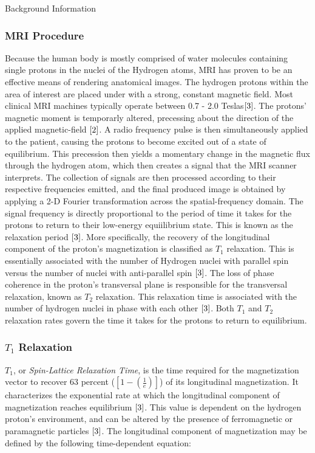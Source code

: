 \documentclass[a4paper,12pt]{article}
\begin{document}
\begin{section}{Background Information}
\subsubsection{MRI Procedure}
Because the human body is mostly comprised of water molecules containing single protons in the nuclei of the Hydrogen atoms, MRI has proven to be an effective means of rendering anatomical images. The hydrogen protons within the area of interest are placed under with a strong, constant magnetic field.
Most clinical MRI machines typically operate between 0.7 - 2.0 Teslas$\cite{3}$. 
The protons' magnetic moment is temporarly altered, precessing about the direction of the applied magnetic-field $\cite{2}$. 
A radio frequency pulse is then simultaneously applied to the patient, causing the protons to become excited out of a state of equilibrium.
This precession then yields a momentary change in the magnetic flux through the hydrogen atom, which then creates a signal that the MRI scanner interprets. The collection of signals are then processed according to their respective frequencies emitted, and the final produced image is obtained by applying a 2-D Fourier transformation across the spatial-frequency domain. 
The signal frequency is directly proportional to the period of time it takes for the protons to return to their low-energy equiilibrium state. This is known as the relaxation period $\cite{3}$. 
More specifically, the recovery of the longitudinal component of the proton's magnetization is classified as $T_1$ relaxation. This is essentially associated with the number of Hydrogen nuclei with parallel spin versus the number of nuclei with anti-parallel spin $\cite{3}$. 
The loss of phase coherence in the proton's transversal plane is responsible for the transversal relaxation, known as $T_2$ relaxation. This relaxation time is associated with the number of hydrogen nuclei in phase with each other $\cite{3}$. 
Both $T_1$ and $T_2$ relaxation rates govern the time it takes for the protons to return to equilibrium.


\newpage
\subsubsection{$T_1$ Relaxation}
$T_1$, or {\em Spin-Lattice Relaxation Time}, is the time required for the magnetization vector to recover 63 percent ($[1-(\frac{1}{e})]$) of its longitudinal magnetization. It characterizes the exponential rate at which the longitudinal component of magnetization reaches equilibrium $\cite{3}$. This value is dependent on the hydrogen proton's environment, and can be altered by the presence of ferromagnetic or paramagnetic particles $\cite{3}$. The longitudinal component of magnetization may be defined by the following time-dependent equation:


\end{section}
\end{document}
